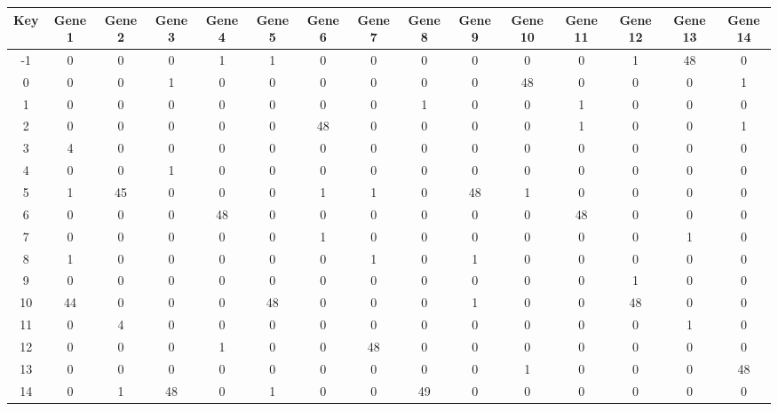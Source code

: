 \begin{tabular}{|c|c|c|c|c|c|c|c|c|c|c|c|c|c|c|}
\hline
Key & Gene 1 & Gene 2 & Gene 3 & Gene 4 & Gene 5 & Gene 6 & Gene 7 & Gene 8 & Gene 9 & Gene 10 & Gene 11 & Gene 12 & Gene 13 & Gene 14 \\
\hline
-1 & 0 & 0 & 0 & 1 & 1 & 0 & 0 & 0 & 0 & 0 & 0 & 1 & 48 & 0 \\
0 & 0 & 0 & 1 & 0 & 0 & 0 & 0 & 0 & 0 & 48 & 0 & 0 & 0 & 1 \\
1 & 0 & 0 & 0 & 0 & 0 & 0 & 0 & 1 & 0 & 0 & 1 & 0 & 0 & 0 \\
2 & 0 & 0 & 0 & 0 & 0 & 48 & 0 & 0 & 0 & 0 & 1 & 0 & 0 & 1 \\
3 & 4 & 0 & 0 & 0 & 0 & 0 & 0 & 0 & 0 & 0 & 0 & 0 & 0 & 0 \\
4 & 0 & 0 & 1 & 0 & 0 & 0 & 0 & 0 & 0 & 0 & 0 & 0 & 0 & 0 \\
5 & 1 & 45 & 0 & 0 & 0 & 1 & 1 & 0 & 48 & 1 & 0 & 0 & 0 & 0 \\
6 & 0 & 0 & 0 & 48 & 0 & 0 & 0 & 0 & 0 & 0 & 48 & 0 & 0 & 0 \\
7 & 0 & 0 & 0 & 0 & 0 & 1 & 0 & 0 & 0 & 0 & 0 & 0 & 1 & 0 \\
8 & 1 & 0 & 0 & 0 & 0 & 0 & 1 & 0 & 1 & 0 & 0 & 0 & 0 & 0 \\
9 & 0 & 0 & 0 & 0 & 0 & 0 & 0 & 0 & 0 & 0 & 0 & 1 & 0 & 0 \\
10 & 44 & 0 & 0 & 0 & 48 & 0 & 0 & 0 & 1 & 0 & 0 & 48 & 0 & 0 \\
11 & 0 & 4 & 0 & 0 & 0 & 0 & 0 & 0 & 0 & 0 & 0 & 0 & 1 & 0 \\
12 & 0 & 0 & 0 & 1 & 0 & 0 & 48 & 0 & 0 & 0 & 0 & 0 & 0 & 0 \\
13 & 0 & 0 & 0 & 0 & 0 & 0 & 0 & 0 & 0 & 1 & 0 & 0 & 0 & 48 \\
14 & 0 & 1 & 48 & 0 & 1 & 0 & 0 & 49 & 0 & 0 & 0 & 0 & 0 & 0 \\
\hline
\end{tabular}